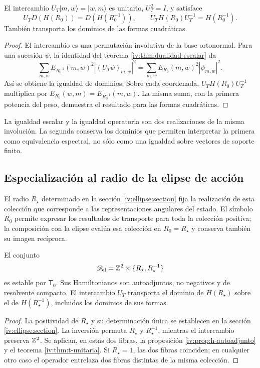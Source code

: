 \begin{theorem}
\label{iv:thm:t-unitaria}
\label{prop:dualidad-radios-k}
El intercambio
\(U_T|m,w\rangle=|w,m\rangle\) es unitario,
\(U_T^2=I\), y satisface
\begin{equation}
 U_TD(H(R_0))=D(H(R_0^{-1})),
 \qquad U_TH(R_0)U_T^{-1}=H(R_0^{-1}).
 \label{iv:eq:conjugacion-h}
\end{equation}
También transporta los dominios de las formas cuadráticas.
\end{theorem}
\begin{proof}
El intercambio es una permutación involutiva de la base
ortonormal. Para una sucesión \(\psi\), la identidad del
teorema \ref{iv:thm:dualidad-escalar} da
\[
 \sum_{m,w}E_{R_0^{-1}}(m,w)^2|(U_T\psi)_{m,w}|^2
 =\sum_{m,w}E_{R_0}(m,w)^2|\psi_{m,w}|^2.
\]
Así se obtiene la igualdad de dominios. Sobre cada coordenada,
\(U_TH(R_0)U_T^{-1}\) multiplica por
\(E_{R_0}(w,m)=E_{R_0^{-1}}(m,w)\). La misma suma, con
la primera potencia del peso, demuestra el resultado para las
formas cuadráticas.
\end{proof}

La igualdad escalar y la igualdad operatoria son dos realizaciones
de la misma involución. La segunda conserva los dominios que
permiten interpretar la primera como equivalencia espectral,
no sólo como una igualdad sobre vectores de soporte finito.

\subsection{Especialización al radio de la elipse de acción}

El radio \(R_\star\) determinado en la sección
\ref{iv:ellipse:section} fija la realización de esta colección que
corresponde a las representaciones angulares del estado. El símbolo
\(R_0\) permite expresar los resultados de transporte para toda la
colección positiva; la composición con la elipse evalúa esa colección en
\(R_0=R_\star\) y conserva también su imagen recíproca.

\begin{corollary}
\label{iv:cor:radio-especializado}
El conjunto
\[
 \mathscr D_{\mathrm{el}}
 =\mathbb Z^2\times\{R_\star,R_\star^{-1}\}
\]
es estable por \(\mathsf T_0\). Sus Hamiltonianos son autoadjuntos,
no negativos y de resolvente compacto. El intercambio \(U_T\)
transporta el dominio de \(H(R_\star)\) sobre el de
\(H(R_\star^{-1})\), incluidos los dominios de sus formas.
\end{corollary}
\begin{proof}
La positividad de \(R_\star\) y su determinación única se establecen
en la sección \ref{iv:ellipse:section}. La inversión permuta
\(R_\star\) y \(R_\star^{-1}\), mientras el intercambio preserva
\(\mathbb Z^2\). Se aplican, en estas dos fibras, la proposición
\ref{iv:prop:h-autoadjunto} y el teorema \ref{iv:thm:t-unitaria}.
Si \(R_\star=1\), las dos fibras coinciden; en cualquier otro caso
el operador entrelaza dos fibras distintas de la misma colección.
\end{proof}


